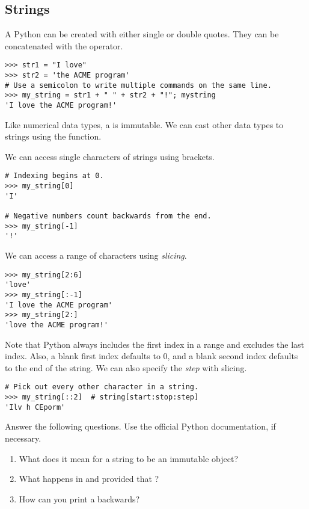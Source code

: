 \subsection*{Strings}
A Python  can be created with either single or double quotes. They can be concatenated with the \li{+} operator.
\begin{lstlisting}
>>> str1 = "I love"
>>> str2 = 'the ACME program'
# Use a semicolon to write multiple commands on the same line.
>>> my_string = str1 + " " + str2 + "!"; mystring
'I love the ACME program!'
\end{lstlisting}

Like numerical data types, a  is immutable. We can cast other data types to strings using the  function.

We can access single characters of strings using brackets.

\begin{lstlisting}
# Indexing begins at 0.
>>> my_string[0]
'I'

# Negative numbers count backwards from the end.
>>> my_string[-1]
'!'
\end{lstlisting}

We can access a range of characters using \emph{slicing}.
\begin{lstlisting}
>>> my_string[2:6]
'love'
>>> my_string[:-1]
'I love the ACME program'
>>> my_string[2:]
'love the ACME program!'
\end{lstlisting}
Note that Python always includes the first index in a range and excludes the last index. Also, a blank first index defaults to 0, and a blank second index defaults to the end of the string. We can also specify the \emph{step} with slicing.
\begin{lstlisting}
# Pick out every other character in a string.
>>> my_string[::2]	# string[start:stop:step]
'Ilv h CEporm'
\end{lstlisting}


\begin{problem}
Answer the following questions. Use the official Python documentation, if necessary.
\begin{enumerate}
\item What does it mean for a string to be an immutable object? 
\item What happens in  and  provided 
that ? 
\item How can you print a  backwards?
\end{enumerate}
\end{problem}

